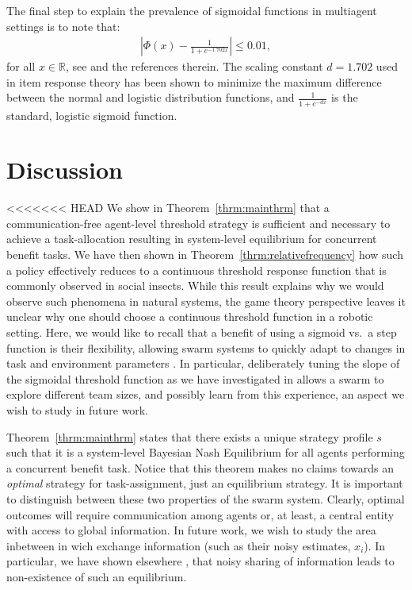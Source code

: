 \documentclass[conference]{ieeeconf}
\def\R{\mathbb{R}}
\begin{document}
The final step to explain the prevalence of sigmoidal functions in multiagent settings is to note that:
\begin{align}
|\Phi(x)-\frac{1}{1+e^{-1.702x}}|\leq 0.01,
\end{align}
for all $x\in\R$, see \cite{camilli1994} and the references therein. The scaling constant $d = 1.702$ used in item response theory has been shown to minimize the
maximum difference between the normal and logistic distribution functions, and $\frac{1}{1+e^{-dx}}$ is the standard, logistic sigmoid function. 



\section{Discussion}\label{sec:disc}
<<<<<<< HEAD
We show in Theorem~\ref{thrm:mainthrm} that a communication-free agent-level threshold strategy is sufficient and necessary to achieve a task-allocation resulting in system-level equilibrium for concurrent benefit tasks. We have then shown in Theorem~\ref{thrm:relativefrequency} how such a policy effectively reduces to a continuous threshold response function that is commonly observed in social insects. While this result explains why we would observe such phenomena in natural systems, the game theory perspective leaves it unclear why one should choose a continuous threshold function in a robotic setting. Here, we would like to recall that a benefit of using a sigmoid vs.\ a step function is their flexibility, allowing swarm systems to quickly adapt to changes in task and environment parameters \cite{Bonabeau1997}. In particular, deliberately tuning the slope of the sigmoidal threshold function as we have investigated in \cite{kanakia2014} allows a swarm to explore different team sizes, and possibly learn from this experience, an aspect we wish to study in future work. 

Theorem~\ref{thrm:mainthrm} states that there exists a unique strategy profile $s$ such that it is a system-level Bayesian Nash Equilibrium for all agents performing a concurrent benefit task. Notice that this theorem makes no claims towards an \emph{optimal} strategy for task-assignment, just an equilibrium strategy. It is important to distinguish between these two properties of the swarm system. Clearly, optimal outcomes will require communication among agents or, at least, a central entity with access to global information. In future work, we wish to study the area inbetween in wich exchange information (such as their noisy estimates, $x_i$). In particular, we have shown elsewhere \cite{Touri2014}, that noisy sharing of information leads to non-existence of such an equilibrium.
\end{document}
